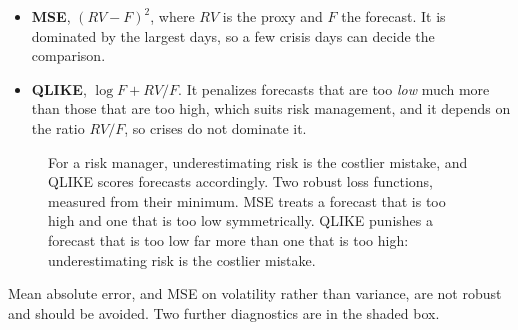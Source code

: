 \begin{itemize}
  \item \textbf{MSE}, $(RV - F)^2$, where $RV$ is the proxy and $F$ the forecast. It is dominated by the largest days, so a few crisis days can decide the comparison.
  \item \textbf{QLIKE}, $\log F + RV/F$. It penalizes forecasts that are too \emph{low} much more than those that are too high, which suits risk management, and it depends on the ratio $RV/F$, so crises do not dominate it.
\end{itemize}

\begin{figure}[htbp]
\centering
{}
\caption{For a risk manager, underestimating risk is the costlier mistake, and QLIKE scores forecasts accordingly. Two robust loss functions, measured from their minimum. MSE treats a forecast that is too high and one that is too low symmetrically. QLIKE punishes a forecast that is too low far more than one that is too high: underestimating risk is the costlier mistake.}
\label{fig:10-qlike}
\end{figure}

Mean absolute error, and MSE on volatility rather than variance, are not robust and should be avoided. Two further diagnostics are in the shaded box.

